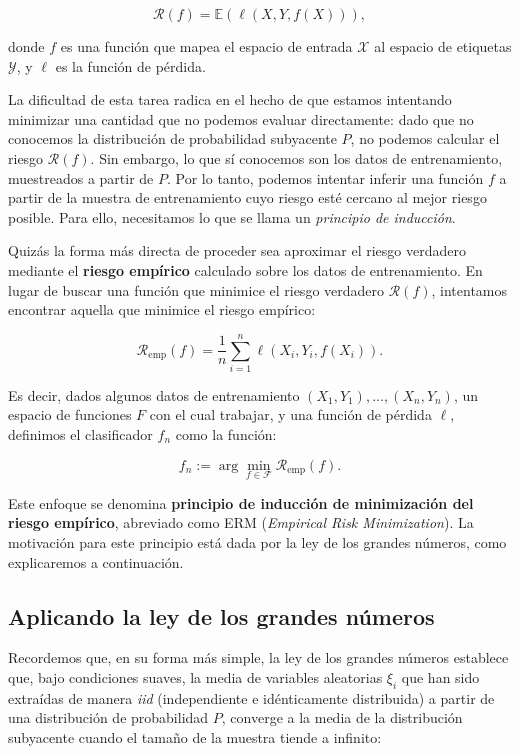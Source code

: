 \documentclass{report}
\begin{document}
\[
\mathcal{R}(f) = \mathbb{E}(\ell(X, Y, f(X))),
\]

donde \(f\) es una función que mapea el espacio de entrada \(\mathcal{X}\) al espacio de etiquetas \(\mathcal{Y}\), y \(\ell\) 
es la función de pérdida.\newline

La dificultad de esta tarea radica en el hecho de que estamos intentando minimizar una cantidad que no 
podemos evaluar directamente: dado que no conocemos la distribución de probabilidad subyacente \(P\), 
no podemos calcular el riesgo \(\mathcal{R}(f)\). Sin embargo, lo que sí conocemos son los datos de entrenamiento, 
muestreados a partir de \(P\). Por lo tanto, podemos intentar inferir una función \(f\) a partir de la muestra 
de entrenamiento cuyo riesgo esté cercano al mejor riesgo posible. Para ello, necesitamos lo que se llama 
un \textit{principio de inducción}.\newline

Quizás la forma más directa de proceder sea aproximar el riesgo verdadero mediante el \textbf{riesgo empírico} 
calculado sobre los datos de entrenamiento. En lugar de buscar una función que minimice el riesgo verdadero 
\(\mathcal{R}(f)\), intentamos encontrar aquella que minimice el riesgo empírico:

\[
\mathcal{R}_{\text{emp}}(f) = \frac{1}{n} \sum_{i=1}^{n} \ell(X_i, Y_i, f(X_i)).
\]

Es decir, dados algunos datos de entrenamiento \((X_1, Y_1), \dots, (X_n, Y_n)\), un espacio de funciones 
\(F\) con el cual trabajar, y una función de pérdida \(\ell\), definimos el clasificador \(f_n\) como la función:

\[
f_n := \arg\min_{f \in \mathcal{F}} \mathcal{R}_{\text{emp}}(f).
\]

Este enfoque se denomina \textbf{principio de inducción de minimización del riesgo empírico}, abreviado como 
ERM (\textit{Empirical Risk Minimization}). La motivación para este principio está dada por la ley de los 
grandes números, como explicaremos a continuación.

\subsection{Aplicando la ley de los grandes números}

Recordemos que, en su forma más simple, la ley de los grandes números
establece que, bajo condiciones suaves, la media de variables aleatorias \(\xi_i\) que han sido extraídas 
de manera \textit{iid} (independiente e idénticamente distribuida) a partir de una distribución de probabilidad 
\(P\), converge a la media de la distribución subyacente cuando el tamaño de la muestra tiende a infinito:
\end{document}
